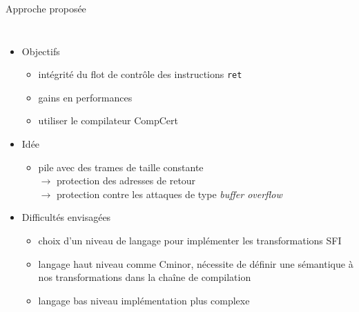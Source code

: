 \documentclass[10pt,usenames,dvipsnames]{beamer}
\begin{document}
\begin{frame}{Approche proposée}
	\begin{columns}
			\begin{itemize}
				\item Objectifs
					\begin{itemize}
						\item intégrité du flot de contrôle des instructions \texttt{ret}
						\item gains en performances
						\item utiliser le compilateur CompCert
					\end{itemize}
				\item<2-> Idée
					\begin{itemize}
						\item pile avec des trames de taille constante\\
						$\rightarrow$ protection des adresses de retour\\
						$\rightarrow$ protection contre les attaques de type \textit{buffer overflow}
					\end{itemize}
				\item<3> Difficultés envisagées
					\begin{itemize}
						\item choix d'un niveau de langage pour implémenter les transformations SFI
						\item langage haut niveau comme Cminor, nécessite de définir une sémantique à nos transformations dans la chaîne de compilation
						\item langage bas niveau implémentation plus complexe
					\end{itemize}
			\end{itemize}
	\end{columns}
\end{frame}
\end{document}
